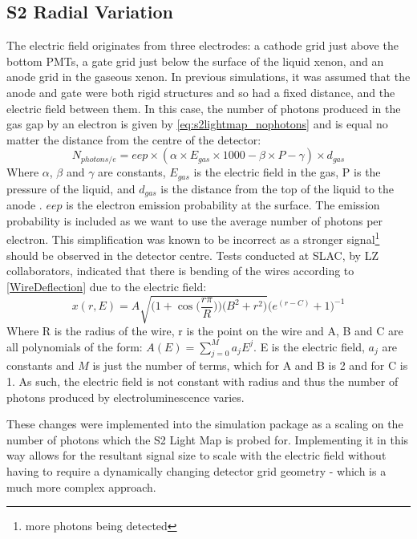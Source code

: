 \subsection{S2 Radial Variation} \label{sec:s2radialvariation}
\par
The electric field originates from three electrodes: a cathode grid just above the bottom PMTs, a gate grid just below the surface of the liquid xenon, and an anode grid in the gaseous xenon.
In previous simulations, it was assumed that the anode and gate were both rigid structures and so had a fixed distance, and the electric field between them.
In this case, the number of photons produced in the gas gap by an electron is given by \autoref{eq:s2lightmap_nophotons} and is equal no matter the distance from the centre of the detector:
\begin{equation}
    N_{photons/e} = eep \times (\alpha \times E_{gas} \times 1000 - \beta \times P - \gamma) \times d_{gas}
    \label{eq:s2lightmap_nophotons}
\end{equation}
Where $\alpha$, $\beta$ and $\gamma$ are constants, $E_{gas}$ is the electric field in the gas, P is the pressure of the liquid, and $d_{gas}$ is the distance from the top of the liquid to the anode \cite{NoPhotonsPerElectron}.
$eep$ is the electron emission probability at the surface.
The emission probability is included as we want to use the average number of photons per electron.
This simplification was known to be incorrect as a stronger signal\footnote{more photons being detected} should be observed in the detector centre.
Tests conducted at SLAC, by LZ collaborators, indicated that there is bending of the wires according to \autoref{WireDeflection} due to the electric field:
\begin{equation}
    x(r,E) = A \sqrt{ \bigg( 1 + \cos{ \Big( \frac{r \pi}{R} } \Big) \bigg) \bigg( B^2 + r^2 \bigg) } \bigg( e^{(r-C)} + 1 \bigg)^{-1} 
    \label{WireDeflection}
\end{equation}
Where R is the radius of the wire, r is the point on the wire and A, B and C are all polynomials of the form: $A(E) = \sum_{j=0}^{M} a_{j} E^{j}$. E is the electric field, $a_{j}$ are constants and $M$ is just the number of terms, which for A and B is 2 and for C is 1.
As such, the electric field is not constant with radius and thus the number of photons produced by electroluminescence varies.
\par
These changes were implemented into the simulation package as a scaling on the number of photons which the S2 Light Map is probed for.
Implementing it in this way allows for the resultant signal size to scale with the electric field without having to require a dynamically changing detector grid geometry - which is a much more complex approach.
